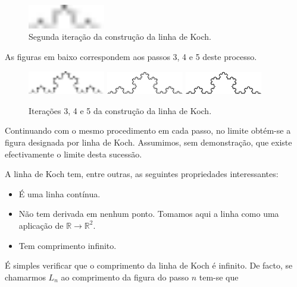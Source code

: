 \documentclass[11pt]{article}
\begin{document}
\begin{figure}[H]
  \centering
  \includegraphics[width=0.3\textwidth]{../images/koch-line-02.pdf}
  \caption{Segunda iteração da construção da linha de Koch.}
\end{figure}


As figuras em baixo correspondem aos passos 3, 4 e 5 deste processo.

\begin{figure}[H]
  \centering
  \hfill
  \includegraphics[width=0.3\textwidth]{../images/koch-line-03.pdf}
  \hfill
  \includegraphics[width=0.3\textwidth]{../images/koch-line-04.pdf}
  \hfill
  \includegraphics[width=0.3\textwidth]{../images/koch-line-05.pdf}
  \hfill
  \caption{Iterações 3, 4 e 5 da construção da linha de Koch.}
\end{figure}


Continuando com o mesmo procedimento em cada passo, no limite obtém-se
a figura designada por linha de Koch. Assumimos, sem demonstração, que
existe efectivamente o limite desta sucessão.

A linha de Koch tem, entre outras, as seguintes propriedades
interessantes:


\begin{itemize}

\item É uma linha contínua.

\item Não tem derivada em nenhum ponto. Tomamos aqui a linha como uma
  aplicação de $\mathbb{R} \to \mathbb{R}^2$.

\item Tem comprimento infinito.

\end{itemize}


É simples verificar que o comprimento da linha de Koch é infinito. De
facto, se chamarmos $L_n$ ao comprimento da figura do passo $n$ tem-se
que
\end{document}
